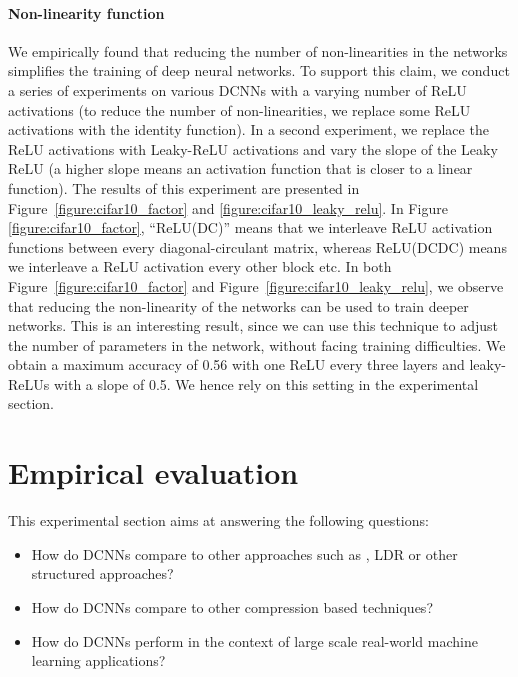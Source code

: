 \paragraph{Non-linearity function}

We empirically found that reducing the number of non-linearities in the networks simplifies the training of deep neural networks.
To support this claim, we conduct a series of experiments on various DCNNs with a varying number of ReLU activations (to reduce the number of non-linearities, we replace some ReLU activations with the identity function).
In a second experiment, we replace the ReLU activations with Leaky-ReLU activations and vary the slope of the Leaky ReLU (a higher slope means an activation function that is closer to a linear function).
The results of this experiment are presented in Figure~\ref{figure:cifar10_factor} and \ref{figure:cifar10_leaky_relu}.
In Figure \ref{figure:cifar10_factor}, ``ReLU(DC)'' means that we interleave ReLU activation functions between every diagonal-circulant matrix, whereas ReLU(DCDC) means we interleave a ReLU activation every other block etc.
In both Figure~\ref{figure:cifar10_factor} and  Figure~\ref{figure:cifar10_leaky_relu}, we observe that reducing the non-linearity of the networks can be used to train deeper networks.
This is an interesting result, since  we can use this technique to adjust the number of parameters in the network, without facing training difficulties. We obtain a maximum accuracy of 0.56 with one ReLU every three layers and leaky-ReLUs with a slope of 0.5.
We hence rely on this setting in the experimental section. 

\section{Empirical evaluation}
\label{section:empirical_evaluation}

This experimental section aims at answering the following questions:
\begin{itemize}
    \item[] How do DCNNs compare to other approaches such as \ACDC, LDR or other structured approaches?
    \item[] How do DCNNs compare to other compression based techniques?
    \item[] How do DCNNs perform in the context of large scale real-world machine learning applications?  
\end{itemize}


